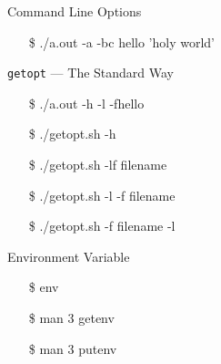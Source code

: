\begin{frame}{Command Line Options}
  \begin{center}
  \end{center}\ttfamily
  \begin{itemize}
  \item[\$] ./a.out -a -bc hello 'holy world'
  \end{itemize}
\end{frame}

\begin{frame}{\texttt{getopt} --- The Standard Way}
  \begin{iblock}{}
    \begin{center}
    \end{center}
  \end{iblock}\ttfamily
  \begin{itemize}
  \item[\$] ./a.out -h -l -fhello
  \end{itemize}
\end{frame}

\begin{frame}
  \begin{iblock}{}
    \begin{center}
    \end{center}
  \end{iblock}\ttfamily
  \begin{itemize}
  \item[\$] ./getopt.sh -h
  \item[\$] ./getopt.sh -lf filename
  \item[\$] ./getopt.sh -l -f filename
  \item[\$] ./getopt.sh -f filename -l
  \end{itemize}
\end{frame}

\begin{frame}{Environment Variable}
  \begin{minipage}{.5\linewidth}
    \begin{center}
    \end{center}
  \end{minipage}\quad
  \begin{minipage}{.45\linewidth}
  \ttfamily
  \begin{itemize}
  \item[\$] env
  \item[\$] man 3 getenv
  \item[\$] man 3 putenv
  \end{itemize}  
  \end{minipage}
\end{frame}


